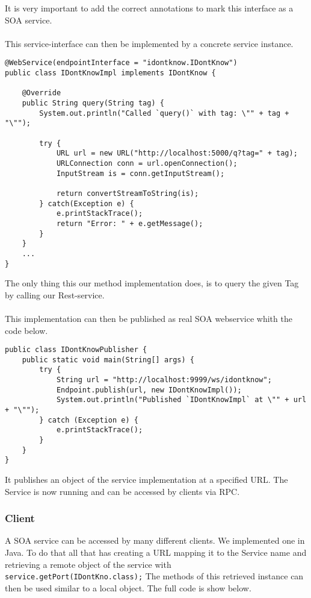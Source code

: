 \documentclass[11pt, a4paper]{article}
\begin{document}
It is very important to add the correct annotations to mark this interface as a SOA service.
\\\\
This service-interface can then be implemented by a concrete service instance.

\begin{lstlisting}
@WebService(endpointInterface = "idontknow.IDontKnow")
public class IDontKnowImpl implements IDontKnow {

	@Override
	public String query(String tag) {
		System.out.println("Called `query()` with tag: \"" + tag + "\"");
	
		try {
			URL url = new URL("http://localhost:5000/q?tag=" + tag);
			URLConnection conn = url.openConnection();
			InputStream is = conn.getInputStream();

			return convertStreamToString(is);
		} catch(Exception e) {
			e.printStackTrace();
			return "Error: " + e.getMessage();
		}
	}
	...
}
 \end{lstlisting}
 
The only thing this our method implementation does, is to query the given Tag by calling our Rest-service.
\\\\
This implementation can then be published as real SOA webservice whith the code below.

\begin{lstlisting}
public class IDontKnowPublisher {
	public static void main(String[] args) {
		try {
			String url = "http://localhost:9999/ws/idontknow";
			Endpoint.publish(url, new IDontKnowImpl());
			System.out.println("Published `IDontKnowImpl` at \"" + url + "\"");
		} catch (Exception e) {
			e.printStackTrace();
		}
	}
}
\end{lstlisting}

It publishes an object of the service implementation at a specified URL. The Service is now running and can be accessed by clients via RPC.

\subsubsection{Client}

A SOA service can be accessed by many different clients. We implemented one in Java. To do that all that has creating a URL mapping it to the Service name and retrieving a remote  object of the service with \lstinline|service.getPort(IDontKno.class);| The methods of this retrieved instance can then be used similar to a local object. The full code is show below.
\end{document}
